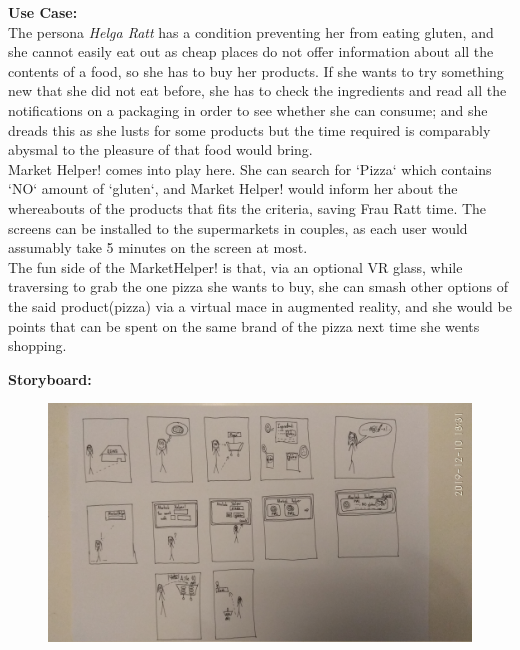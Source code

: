 \documentclass[a4paper,10pt,oneside]{scrreprt}
\begin{document}
			\noindent \textbf{Use Case:}\\
			\indent The persona \textit{Helga Ratt} has a condition preventing her from eating gluten, and she cannot easily eat out as cheap places do not offer information about all the contents of a food, so she has to buy her products. If she wants to try something new that she did not eat before, she has to check the ingredients and read all the notifications on a packaging in order to see whether she can consume; and she dreads this as she lusts for some products but the time required is comparably abysmal to the pleasure of that food would bring.\\

			Market Helper! comes into play here. She can search for `Pizza` which contains `NO` amount of `gluten`, and Market Helper! would inform her about the whereabouts of the products that fits the criteria, saving Frau Ratt time. The screens can be installed to the supermarkets in couples, as each user would assumably take 5 minutes on the screen at most.\\

			The fun side of the MarketHelper! is that, via an optional VR glass, while traversing to grab the one pizza she wants to buy, she can smash other options of the said product(pizza) via a virtual mace in augmented reality, and she would be points that can be spent on the same brand of the pizza next time she wents shopping.

			\noindent \textbf{Storyboard:}\\

			\begin{figure}[H]
				\centering

				\includegraphics[scale=0.16, clip, trim={30em 0em 65em 10em}]{images/s2.jpg}
			\end{figure}
\end{document}
